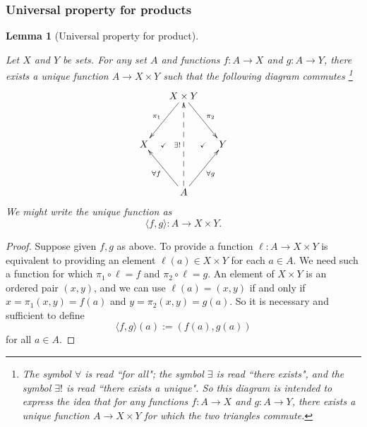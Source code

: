 \documentclass{book}
\def\to{\rightarrow}
\def\taking{\colon}
\def\la{\langle}
\def\ra{\rangle}
\newcommand{\prodmap}[2]{\la#1,#2\ra}
\newtheorem{lemma}[subsubsection]{Lemma}
\theoremstyle{remark}
\theoremstyle{definition}
\begin{document}

\subsubsection{Universal property for products}

\begin{lemma}[Universal property for product]\label{lemma:up for prod}

Let $X$ and $Y$ be sets. For any set $A$ and functions $f\taking A\to X$ and $g\taking A\to Y$, there exists a unique function $A\to X\times Y$ such that the following diagram commutes \footnote{The symbol $\forall$ is read ``for all"; the symbol $\exists$ is read ``there exists", and the symbol $\exists!$ is read ``there exists a unique". So this diagram is intended to express the idea that for any functions $f\taking A\to X$ and $g\taking A\to Y$, there exists a unique function $A\to X\times Y$ for which the two triangles commute.}
\begin{align}\label{dia:univ prop for products}
\xymatrix@=15pt{&X\times Y\ar[ldd]_{\pi_1}\ar[rdd]^{\pi_2}\\\\X\ar@{}[r]|{\checkmark}&&Y\ar@{}[l]|{\checkmark}\\\\&A\ar[luu]^{\forall f}\ar[ruu]_{\forall g}\ar@{-->}[uuuu]^{\exists !}}
\end{align}
We might write the unique function as $$\prodmap{f}{g}\taking A\to X\times Y.$$

\end{lemma}

\begin{proof}

Suppose given $f,g$ as above. To provide a function $\ell\taking A\to X\times Y$ is equivalent to providing an element $\ell(a)\in X\times Y$ for each $a\in A$. We need such a function for which $\pi_1\circ \ell=f$ and $\pi_2\circ \ell=g$. An element of $X\times Y$ is an ordered pair $(x,y)$, and we can use $\ell(a)=(x,y)$ if and only if $x=\pi_1(x,y)=f(a)$ and $y=\pi_2(x,y)=g(a)$. So it is necessary and sufficient to define $$\prodmap{f}{g}(a):=(f(a),g(a))$$ for all $a\in A$.

\end{proof}
\end{document}
